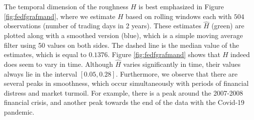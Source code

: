 The temporal dimension of the roughness $H$ is best emphasized in Figure \ref{fig:fedfgrafmand}, where we estimate $H$ based on rolling windows each with $504$ observations (number of trading days in 2 years). These estimates $\hat{H}$ (green) are plotted along with a smoothed version (blue), which is a simple moving average filter using 50 values on both sides. The dashed line is the median value of the estimates, which is equal to $0.1376$. Figure \ref{fig:fedfgrafmand} shows that $H$ indeed does seem to vary in time. Although $\hat{H}$ varies significantly in time, their values always lie in the interval $[0.05, 0.28]$. Furthermore, we observe that there are several peaks in smoothness, which occur simultaneously with periods of financial distress and market turmoil. For example, there is a peak around the 2007-2008 financial crisis, and another peak towards the end of the data with the Covid-19 pandemic. 

